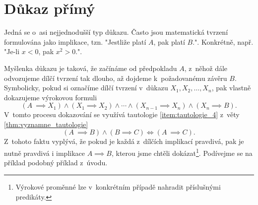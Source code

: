 \section{Důkaz přímý}\label{sec:dukaz_primy}
Jedná se o~asi nejjednodušší typ důkazu. Často jsou matematická tvrzení formulována jako implikace, tzn. "Jestliže platí $A$, pak platí $B$.". Konkrétně, např. "Je-li $x<0$, pak $x^2>0$.".\par
Myšlenka důkazu je taková, že začínáme od předpokladu $A$, z~něhož dále odvozujeme dílčí tvrzení tak dlouho, až dojdeme k~požadovanému závěru $B$. Symbolicky, pokud si označíme dílčí tvrzení v~důkazu $X_1, X_2, \dots, X_n$, pak vlastně dokazujeme výrokovou formuli
\begin{equation}\label{eq:primy_dukaz_formule}
    (A~\implies X_1) \land (X_1 \implies X_2) \land \cdots \land (X_{n-1}\implies X_n) \land (X_n \implies B).
\end{equation}
V~tomto procesu dokazování se využívá tautologie \ref{item:tautologie_4} z~věty \ref{thm:vyznamne_tautologie}
\begin{equation*}
    (A~\implies B) \land (B \implies C) \iff (A~\implies C).
\end{equation*}
Z~tohoto faktu vyplývá, že pokud je každá z~dílčích implikací pravdivá, pak je nutně pravdivá i implikace $A \implies B$, kterou jsme chtěli dokázat\footnote{Výrokové proměnné lze v~konkrétním případě nahradit příslušnými predikáty.}. Podívejme se na příklad podobný příklad z~úvodu.

